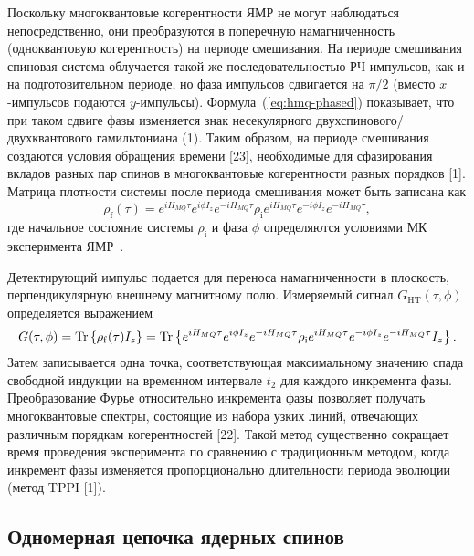 Поскольку многоквантовые когерентности ЯМР не могут наблюдаться непосредственно, они преобразуются в поперечную намагниченность (одноквантовую когерентность) на периоде смешивания. На периоде смешивания спиновая система облучается такой же последовательностью РЧ-импульсов, как и на подготовительном периоде, но фаза импульсов сдвигается на $\pi/2$
(вместо $x$-импульсов подаются  $y$-импульсы).
Формула~(\ref{eq:hmq-phased}) показывает, что при таком сдвиге фазы изменяется знак несекулярного двухспинового/двухквантового гамильтониана (1). Таким образом, на периоде смешивания создаются условия обращения времени [23], необходимые для сфазирования вкладов разных пар спинов в многоквантовые когерентности разных порядков [1].
%
Матрица плотности системы после периода смешивания может быть записана как \cite{Baum1985}
\begin{equation}\label{eq:rho-after-mixing}
  \rho_\mathrm{f}(\tau)
  = e^{i{H_{MQ}}\tau} e^{i\phi I_z} e^{-i{ H_{MQ}}\tau}
  \rho_\mathrm{i}
  e^{i{ H_{MQ}}\tau} e^{-i\phi I_z} e^{-i{H_{MQ}}\tau} ,
\end{equation}
где начальное состояние системы $\rho_\mathrm{i}$
и фаза $\phi$ определяются условиями МК эксперимента ЯМР~\cite{Baum1985}.

Детектирующий импульс подается для переноса намагниченности в плоскость, перпендикулярную внешнему магнитному полю.
Измеряемый сигнал $G_\mathrm{HT}(\tau, \phi)$ определяется выражением
\begin{equation}\label{eq:signal-after-mixing}
  G(\tau, \phi)
  = \mathrm{Tr} \left\{ \rho_\mathrm{f}(\tau) I_z \right\}
  = \mathrm{Tr} \left\{ 
    e^{iH_{MQ}\tau}e^{i\phi I_z}e^{-iH_{MQ}\tau}
    \rho_\mathrm{i}
    e^{iH_{MQ}\tau}e^{-i\phi I_z}e^{-iH_{MQ}\tau}
    I_z
   \right\}.
\end{equation}
%
Затем записывается одна точка, соответствующая максимальному значению спада свободной индукции на временном интервале $t_2$ для каждого инкремента фазы. Преобразование Фурье относительно инкремента фазы позволяет получать многоквантовые спектры, состоящие из набора узких линий, отвечающих различным порядкам когерентностей [22]. Такой метод существенно сокращает время проведения эксперимента по сравнению с традиционным методом, когда инкремент фазы изменяется пропорционально длительности периода эволюции (метод TPPI [1]).



\subsection{Одномерная цепочка ядерных спинов}
\label{sec:model-uniform-chain}

